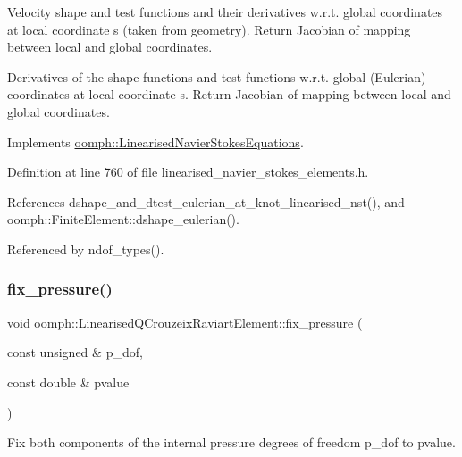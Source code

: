 Velocity shape and test functions and their derivatives w.\+r.\+t. global coordinates at local coordinate s (taken from geometry). Return Jacobian of mapping between local and global coordinates. 

Derivatives of the shape functions and test functions w.\+r.\+t. global (Eulerian) coordinates at local coordinate s. Return Jacobian of mapping between local and global coordinates. 

Implements \hyperlink{classoomph_1_1LinearisedNavierStokesEquations_afb0b66566d03c7f9d8129614297e63ed}{oomph\+::\+Linearised\+Navier\+Stokes\+Equations}.



Definition at line 760 of file linearised\+\_\+navier\+\_\+stokes\+\_\+elements.\+h.



References dshape\+\_\+and\+\_\+dtest\+\_\+eulerian\+\_\+at\+\_\+knot\+\_\+linearised\+\_\+nst(), and oomph\+::\+Finite\+Element\+::dshape\+\_\+eulerian().



Referenced by ndof\+\_\+types().

\mbox{\label{classoomph_1_1LinearisedQCrouzeixRaviartElement_a0a928fd05a669269db7d3d064a072a7b}} 
\subsubsection{\texorpdfstring{fix\+\_\+pressure()}{fix\_pressure()}}
{\footnotesize\ttfamily void oomph\+::\+Linearised\+Q\+Crouzeix\+Raviart\+Element\+::fix\+\_\+pressure (\begin{DoxyParamCaption}\item[{const unsigned \&}]{p\+\_\+dof,  }\item[{const double \&}]{pvalue }\end{DoxyParamCaption})\hspace{0.3cm}{\ttfamily [inline]}}



Fix both components of the internal pressure degrees of freedom p\+\_\+dof to pvalue. 



